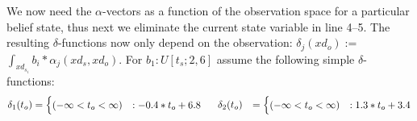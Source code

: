 \documentclass{article} %
\begin{document}
We now need the $\alpha$-vectors as a function of the observation
space for a particular belief state, thus next we eliminate the
current state variable in line 4--5. The resulting $\delta$-functions
now only depend on the observation: $\delta_{j}(xd_o) := $
$\int_{xd_{s_i}} b_i * \alpha_j(xd_s,xd_o)$.  For $b_1: U[t_s;2,6]$
assume the following simple $\delta$-functions:
{\footnotesize
\begin{align}
\delta_{1}(t_o) &= 
\begin{cases}
 (-\infty < t_o< \infty) &: -0.4*t_o +6.8\\
\end{cases}
\hspace{5mm} 
\delta_{2}(t_o) &= \begin{cases}
 (-\infty < t_o< \infty) &: 1.3*t_o +3.4\\
\end{cases}
\nonumber
\end{align}
}
\end{document}
